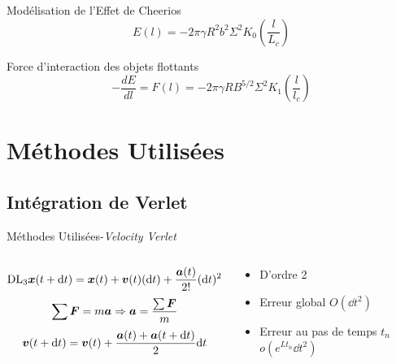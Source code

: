 \documentclass[aspectratio=169,xcolor=dvipsnames]{beamer}
\begin{document}
\begin{frame}{Modélisation de l'Effet de Cheerios\cite{vella_cheerios_2005}}
    \[E(l)=-2\pi\gamma R^2b^2\Sigma^2K_0\left(\frac{l}{L_c}\right)\]
    \begin{block}{Force d'interaction des objets flottants}
        \[-\frac{dE}{dl} = F(l)=-2\pi\gamma RB^{5/2}\Sigma^2K_1\left(\frac{l}{l_c}\right)\]
    \end{block}

\end{frame}

\section{Méthodes Utilisées}
\subsection{Intégration de Verlet}
\begin{frame}{Méthodes Utilisées-\textit{Velocity Verlet}\cite{crivelli_stormer-verlet_2008}}
    \begin{columns}
        \begin{column}[]{0.6\textwidth}
            \[\mathrm{DL}_3 \vb*{x}(t+\dd t)= \vb*{x}(t)+\vb*{v}(t)(\dd t)+\frac{\vb*{a}(t)}{2!}(\dd t)^2+o(\dd t^3)\]
            \[\sum  \vb*{F} = m\vb*{a} \Rightarrow \vb*{a} = \frac{\sum \vb*{F}}{m}\]
            \[\vb*{v}(t+\dd t) = \vb*{v}(t)+\frac{\vb*{a}(t)+\vb*{a}(t+\dd t)}{2}\dd t \]
        \end{column}
        \begin{column}[]{0.35\textwidth}
            \begin{block}{}
                \begin{itemize}
                    \item D'ordre 2 
                    \item Erreur global $O(\dd t^2)$
                    \item Erreur au pas de temps $t_n$ $o(e^{Lt_n}\dd t^2)$
                \end{itemize}
            \end{block}
        \end{column}
    \end{columns}
\end{frame}
\end{document}
